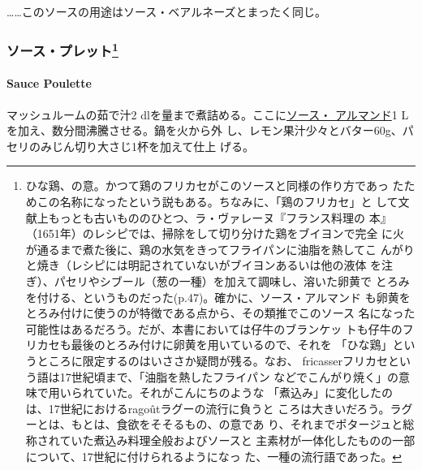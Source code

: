 \begin{recette}
\ldots{}\ldots{}このソースの用途はソース・ベアルネーズとまったく同じ。

\maeaki

\hypertarget{ux30bdux30fcux30b9ux30d7ux30ecux30c3ux30c8109}{%
\subsubsection[ソース・プレット]{\texorpdfstring{ソース・プレット\footnote{ひな鶏、の意。かつて鶏のフリカセがこのソースと同様の作り方であっ
  たためこの名称になったという説もある。ちなみに、「鶏のフリカセ」と
  して文献上もっとも古いもののひとつ、ラ・ヴァレーヌ『フランス料理の
  本』（1651年）のレシピでは、掃除をして切り分けた鶏をブイヨンで完全
  に火が通るまで煮た後に、鶏の水気をきってフライパンに油脂を熱してこ
  んがりと焼き（レシピには明記されていないがブイヨンあるいは他の液体
  を注ぎ）、パセリやシブール（葱の一種）を加えて調味し、溶いた卵黄で
  とろみを付ける、というものだった(p.47)。確かに、ソース・アルマンド
  も卵黄をとろみ付けに使うのが特徴である点から、その類推でこのソース
  名になった可能性はあるだろう。だが、本書においては仔牛のブランケッ
  トも仔牛のフリカセも最後のとろみ付けに卵黄を用いているので、それを
  「ひな鶏」というところに限定するのはいささか疑問が残る。なお、
  fricasserフリカセという語は17世紀頃まで、「油脂を熱したフライパン
  などでこんがり焼く」の意味で用いられていた。それがこんにちのような
  「煮込み」に変化したのは、17世紀におけるragoûtラグーの流行に負うと
  ころは大きいだろう。ラグーとは、もとは、食欲をそそるもの、の意であ
  り、それまでポタージュと総称されていた煮込み料理全般およびソースと
  主素材が一体化したものの一部について、17世紀に付けられるようになっ
  た、一種の流行語であった。}}{ソース・プレット}}\label{ux30bdux30fcux30b9ux30d7ux30ecux30c3ux30c8109}}

\hypertarget{sauce-poulette}{%
\paragraph{Sauce Poulette}\label{sauce-poulette}}


マッシュルームの茹で汁2
dlを\untiers{}量まで煮詰める。ここに\protect\hyperlink{sauce-allemande}{ソース・
アルマンド}1 Lを加え、数分間沸騰させる。鍋を火から外
し、レモン果汁少々とバター60g、パセリのみじん切り大さじ1杯を加えて仕上
げる。


\end{recette}
